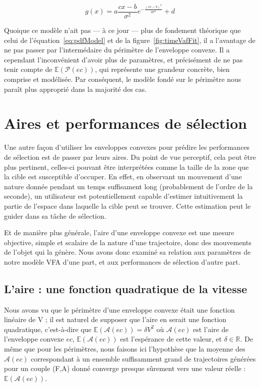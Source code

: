 	\begin{equation}
		g(x) = a\frac{cx-b}{\sigma^{2}}e^{-\frac{(cx-b)^{2}}{2\sigma^{2}} } + d
		\label{eq:pdfModelAf}
	\end{equation}
		

	
	Quoique ce modèle n'ait pas --- à ce jour --- plus de fondement théorique que celui de l'équation~\ref{eq:pdfModel} et de la figure~\ref{fig:timeVafFit}, il a l'avantage de ne pas passer par l'intermédaire du périmètre de l'enveloppe convexe. Il a cependant l'inconvénient d'avoir plus de paramètres, et précisément de ne pas tenir compte de $\mathbb{E}(\mathcal{P}(ec))$, qui représente une grandeur concrète, bien comprise et modélisée. Par conséquent, le modèle fondé sur le périmètre nous paraît plus approprié dans la majorité des cas.
	
\section{Aires et performances de sélection}
	Une autre façon d'utiliser les enveloppes convexes pour prédire les performances de sélection est de passer par leurs aires. Du point de vue perceptif, cela peut être plus pertinent, celles-ci pouvant être interprétées comme la taille de la zone que la cible est susceptible d'occuper. En effet, en observant un mouvement d'une nature donnée pendant un temps suffisament long (probablement de l'ordre de la seconde), un utilisateur est potentiellement capable d'estimer intuitivement la partie de l'espace dans laquelle la cible peut se trouver.	Cette estimation peut le guider dans sa tâche de sélection.
	
	Et de manière plus générale, l'aire d'une enveloppe convexe est une mesure objective, simple et scalaire de la nature d'une trajectoire, donc des mouvements de l'objet qui la génère. Nous avons donc examiné sa relation aux paramètres de notre modèle VFA d'une part, et aux performances de sélection d'autre part.

	\subsection{L'aire : une fonction quadratique de la vitesse}
	Nous avons vu que le périmètre d'une enveloppe convexe était une fonction linéaire de V ; il est naturel de supposer que l'aire en serait une fonction quadratique, c'est-à-dire que $\mathbb{E}(\mathcal{A}(ec)) = \delta{}V^{2}$ où $\mathcal{A}(ec)$ est l'aire de l'enveloppe convexe $ec$, $\mathbb{E}(\mathcal{A}(ec))$ est l'espérance de cette valeur, et $\delta \in \mathbb{R}$. De même que pour les périmètres, nous faisons ici l'hypothèse que la moyenne des $\mathcal{A}(ec)$ correspondant à un ensemble suffisamment grand de trajectoires générées pour un couple (F,A) donné converge presque sûrement vers une valeur réelle : $\mathbb{E}(\mathcal{A}(ec))$.
	
